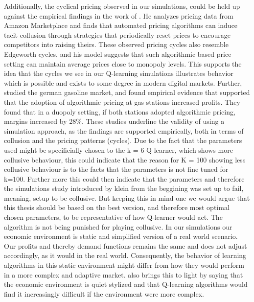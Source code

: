\documentclass{article}
\begin{document}
Additionally, the cyclical pricing observed in our simulations, could be held up against the empirical findings in the work of \cite{LEON2024}. He analyzes pricing data from Amazon Marketplace and finds that automated pricing algorithms can induce tacit collusion through strategies that periodically reset prices to encourage competitors into raising theirs. These observed pricing cycles also resemble Edgeworth cycles, and his model suggests that such algorithmic based price setting can maintain average prices close to monopoly levels. This supports the idea that the cycles we see in our Q-learning simulations illustrates behavior which is possible and exists to some degree in modern digital markets. 
\newline
Further, \cite{Assad} studied the german gasoline market, and found empirical evidence that supported that the adoption of algorithmic pricing at gas stations increased profits. They found that in a duopoly setting, if both stations adopted algorithmic pricing, margins increased by 28\%. 
These studies underline the validity of using a simulation approach, as the findings are supported empirically, both in terms of collusion and the pricing patterns (cycles).
\newline
Due to the fact that the parameters used might be specificially chosen to the k = 6 Q-learner, which shows more collusive behaviour, this could indicate that the reason for K = 100 showing less collusive behaviour is to the facts that the parameters is not fine tuned for  k=100. Further more this could then indicate that the parameters and therefore the simulations study introduced by klein from the beggining was set up to fail, meaning, setup to be collusive. 
\newline
But keeping this in mind one we would argue that this thesis should be based on the best version, and therefore most optimal chosen parameters, to be representative of how Q-learner would act. The algorithm is not being punished for playing collusive.  
\newline
In our simulations our economic environment is static and simplified version of a real world scenario. Our profits and thereby demand functions remains the same and does not adjust accordingly, as it would in the real world. Consequently, the behavior of learning algorithms in this static environment might differ from how they would perform in a more complex and adaptive market. \cite{Klein2021} also brings this to light by saying that the economic environment is quiet stylized and that Q-learning algorithms would find it increasingly difficult if the environment were more complex.
\end{document}
